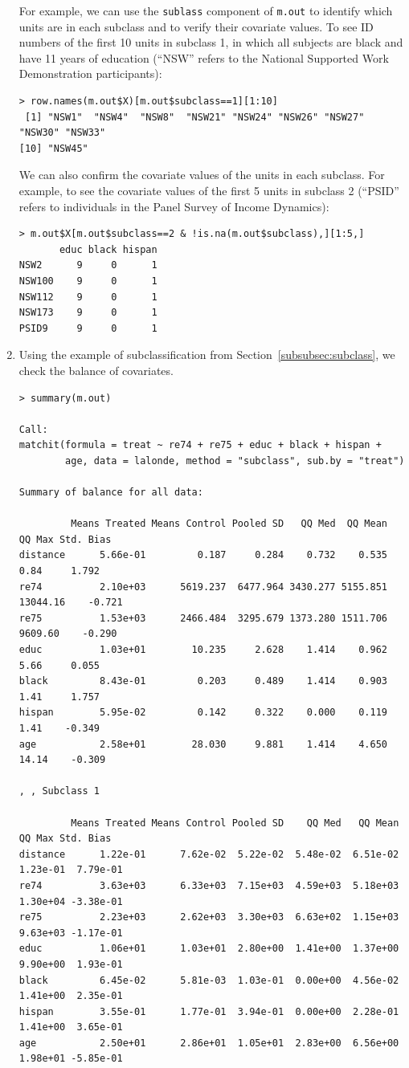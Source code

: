 \documentclass[oneside,letterpaper,titlepage]{article}
\begin{document}
\begin{enumerate}
For example, we can use the {\tt sublass} component of {\tt m.out} to
identify which units are in each subclass and to verify their
covariate values.  To see ID numbers of the first 10 units in subclass
1, in which all subjects are black and have 11 years of education
(``NSW'' refers to the National Supported Work Demonstration
participants):
\begin{verbatim}
> row.names(m.out$X)[m.out$subclass==1][1:10]
 [1] "NSW1"  "NSW4"  "NSW8"  "NSW21" "NSW24" "NSW26" "NSW27" "NSW30" "NSW33"
[10] "NSW45"
\end{verbatim}
We can also confirm the covariate values of the units in each
subclass.  For example, to see the covariate values of the first 5
units in subclass 2 (``PSID'' refers to individuals in the Panel
Survey of Income Dynamics):
\begin{verbatim}
> m.out$X[m.out$subclass==2 & !is.na(m.out$subclass),][1:5,]
       educ black hispan
NSW2      9     0      1
NSW100    9     0      1
NSW112    9     0      1
NSW173    9     0      1
PSID9     9     0      1
\end{verbatim}


\item Using the example of subclassification from
  Section~\ref{subsubsec:subclass}, we check the balance of
  covariates.
\begin{verbatim}
> summary(m.out)

Call:
matchit(formula = treat ~ re74 + re75 + educ + black + hispan +     
        age, data = lalonde, method = "subclass", sub.by = "treat")

Summary of balance for all data:

         Means Treated Means Control Pooled SD   QQ Med  QQ Mean   QQ Max Std. Bias
distance      5.66e-01         0.187     0.284    0.732    0.535     0.84     1.792
re74          2.10e+03      5619.237  6477.964 3430.277 5155.851 13044.16    -0.721
re75          1.53e+03      2466.484  3295.679 1373.280 1511.706  9609.60    -0.290
educ          1.03e+01        10.235     2.628    1.414    0.962     5.66     0.055
black         8.43e-01         0.203     0.489    1.414    0.903     1.41     1.757
hispan        5.95e-02         0.142     0.322    0.000    0.119     1.41    -0.349
age           2.58e+01        28.030     9.881    1.414    4.650    14.14    -0.309
        
, , Subclass 1

         Means Treated Means Control Pooled SD    QQ Med   QQ Mean    QQ Max Std. Bias
distance      1.22e-01      7.62e-02  5.22e-02  5.48e-02  6.51e-02  1.23e-01  7.79e-01
re74          3.63e+03      6.33e+03  7.15e+03  4.59e+03  5.18e+03  1.30e+04 -3.38e-01
re75          2.23e+03      2.62e+03  3.30e+03  6.63e+02  1.15e+03  9.63e+03 -1.17e-01
educ          1.06e+01      1.03e+01  2.80e+00  1.41e+00  1.37e+00  9.90e+00  1.93e-01
black         6.45e-02      5.81e-03  1.03e-01  0.00e+00  4.56e-02  1.41e+00  2.35e-01
hispan        3.55e-01      1.77e-01  3.94e-01  0.00e+00  2.28e-01  1.41e+00  3.65e-01
age           2.50e+01      2.86e+01  1.05e+01  2.83e+00  6.56e+00  1.98e+01 -5.85e-01
        

\end{verbatim}
\end{enumerate}
\end{document}
